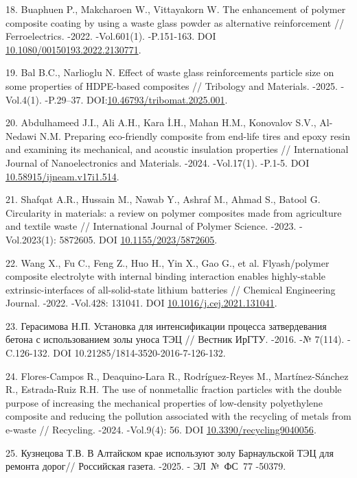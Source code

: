 \begin{refs}
18. Buaphuen P., Makcharoen W., Vittayakorn W. The enhancement of polymer
composite coating by using a waste glass powder as alternative
reinforcement // Ferroelectrics. -2022. -Vol.601(1). -P.151-163. DOI
\href{https://doi.org/10.1080/00150193.2022.2130771?urlappend=\%3Futm_source\%3Dresearchgate.net\%26utm_medium\%3Darticle}{10.1080/00150193.2022.2130771}.

19. Bal B.C., Narlioglu N. Effect of waste glass reinforcements particle
size on some properties of HDPE-based composites // Tribology and
Materials. -2025. -Vol.4(1). -P.29--37.
DOI:\href{https://doi.org/10.46793/tribomat.2025.001}{10.46793/tribomat.2025.001}.

20. Abdulhameed J.I., Ali A.H., Kara İ.H., Mahan H.M., Konovalov S.V.,
Al-Nedawi N.M. Preparing eco-friendly composite from end-life tires
and epoxy resin and examining its mechanical, and acoustic insulation
properties // International Journal of Nanoelectronics and Materials.
-2024. -Vol.17(1). -P.1-5. DOI
\href{https://doi.org/10.58915/ijneam.v17i1.514}{10.58915/ijneam.v17i1.514}.

21. Shafqat A.R., Hussain M., Nawab Y., Ashraf M., Ahmad S., Batool G.
Circularity in materials: a review on polymer composites made from
agriculture and textile waste // International Journal of Polymer
Science. -2023. -Vol.2023(1): 5872605. DOI
\href{https://doi.org/10.1155/2023/5872605}{10.1155/2023/5872605}.

22. Wang X., Fu C., Feng Z., Huo H., Yin X., Gao G., et al. Flyash/polymer
composite electrolyte with internal binding interaction enables
highly-stable extrinsic-interfaces of all-solid-state lithium
batteries // Chemical Engineering Journal. -2022. -Vol.428: 131041.
DOI
\href{https://doi.org/10.1016/j.cej.2021.131041}{10.1016/j.cej.2021.131041}.

23. Герасимова Н.П. Установка для интенсификации процесса затвердевания
бетона с использованием золы уноса ТЭЦ // Вестник ИрГТУ. -2016. -№
7(114). -C.126-132. DOI 10.21285/1814-3520-2016-7-126-132.

24. Flores-Campos R., Deaquino-Lara R., Rodríguez-Reyes M.,
Martínez-Sánchez R., Estrada-Ruiz R.H. The use of nonmetallic fraction
particles with the double purpose of increasing the mechanical
properties of low-density polyethylene composite and reducing the
pollution associated with the recycling of metals from e-waste //
Recycling. -2024. -Vol.9(4): 56. DOI
\href{https://doi.org/10.3390/recycling9040056}{10.3390/recycling9040056}.

25. Кузнецова Т.В. В Алтайском крае используют золу Барнаульской ТЭЦ для
ремонта дорог// Российская газета. -2025. - ЭЛ~№~ФС~77 -50379.


\end{refs}
